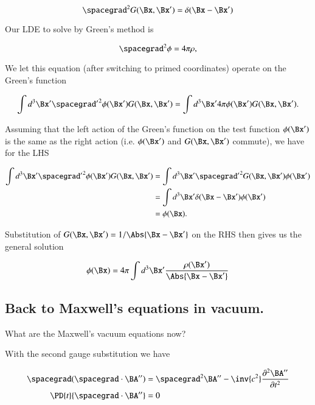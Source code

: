 \begin{equation}\label{eqn:relativisticElectrodynamicsL14:294}
\spacegrad^2 G(\Bx, \Bx') = \delta(\Bx - \Bx')
\end{equation}

Our LDE to solve by Green's method is

\begin{equation}\label{eqn:relativisticElectrodynamicsL14:296}
\spacegrad^2 \phi = 4 \pi \rho,
\end{equation}

We let this equation (after switching to primed coordinates) operate on the Green's function

\begin{equation}\label{eqn:relativisticElectrodynamicsL14:298}
\int d^3 \Bx' {\spacegrad'}^2 \phi(\Bx') G(\Bx, \Bx') 
=
\int d^3 \Bx' 4 \pi \phi(\Bx') G(\Bx, \Bx').
\end{equation}

Assuming that the left action of the Green's function on the test function $\phi(\Bx')$ is the same as the right action (i.e. $\phi(\Bx')$ and $G(\Bx, \Bx')$ commute), we have for the LHS

\begin{align*}
\int d^3 \Bx' {\spacegrad'}^2 \phi(\Bx') G(\Bx, \Bx') 
&=
\int d^3 \Bx' {\spacegrad'}^2 G(\Bx, \Bx') \phi(\Bx') \\
&=
\int d^3 \Bx' \delta(\Bx - \Bx') \phi(\Bx') \\
&=
\phi(\Bx).
\end{align*}

Substitution of $G(\Bx, \Bx') = 1/\Abs{\Bx - \Bx'}$ on the RHS then gives us the general solution

\begin{equation}\label{eqn:relativisticElectrodynamicsL14:300}
\phi(\Bx) = 4 \pi \int d^3 \Bx' \frac{\rho(\Bx') }{\Abs{\Bx - \Bx'}}
\end{equation}

\subsection{Back to Maxwell's equations in vacuum.}
What are the Maxwell's vacuum equations now?

With the second gauge substitution we have

\begin{align*}
\spacegrad (\spacegrad \cdot \BA'') &= \spacegrad^2 \BA''  - \inv{c^2} \frac{\partial^2 \BA''}{\partial t^2} \\
\PD{t}{\spacegrad \cdot \BA''}  &= 0
\end{align*}

